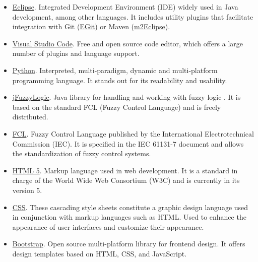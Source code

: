 \begin{itemize}
\item \href{https://www.eclipse.org/ide/}{Eclipse}. Integrated Development Environment (IDE) widely used in Java development, among other languages. 
It includes utility plugins that facilitate integration with Git (\href{https://www.eclipse.org/egit/}{EGit}) or Maven (\href{https://www.eclipse.org/m2e/}{m2Eclipse}).\newline

\item \href{https://code.visualstudio.com/}{Visual Studio Code}. Free and open source code editor, which offers a large number of plugins and language support.\newline

\item \href{https://www.python.org/}{Python}. Interpreted, multi-paradigm, dynamic and multi-platform programming language. It stands out for its readability and usability.\newline

\item \href{http://jfuzzylogic.sourceforge.net/html/index.html}{jFuzzyLogic}. Java library for handling and working with fuzzy logic \cite{cingolani_jfuzzylogic_2012,cingolani_jfuzzylogic_2013}. It is based on the standard FCL (Fuzzy Control Language) and is freely distributed.\newline

\item \href{http://ffll.sourceforge.net/fcl.htm}{FCL}. Fuzzy Control Language published by the International Electrotechnical Commission (IEC). It is specified in the IEC 61131-7 document and allows the standardization of fuzzy control systems.\newline

\item \href{https://www.w3.org/html/logo/}{HTML 5}. Markup language used in web development. It is a standard in charge of the World Wide Web Consortium (W3C) and is currently in its version 5.\newline

\item \href{https://www.w3.org/Style/CSS/Overview.en.html}{CSS}. These cascading style sheets constitute a graphic design language used in conjunction with markup languages such as HTML. Used to enhance the appearance of user interfaces and customize their appearance.\newline
	
\item \href{https://getbootstrap.com/}{Bootstrap}. Open source multi-platform library for frontend design. It offers design templates based on HTML, CSS, and JavaScript.\newline


\end{itemize}
